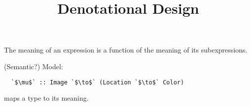 \documentclass[12pt]{article}
\begin{document}
\title{Denotational Design}
\date{}
\author{}
\maketitle


The meaning of an expression is a function of the meaning of its subexpressions.

(Semantic?) Model:
\begin{verbatim}
  `$\mu$` :: Image `$\to$` (Location `$\to$` Color)
\end{verbatim}

maps a type to its meaning.
\end{document}
